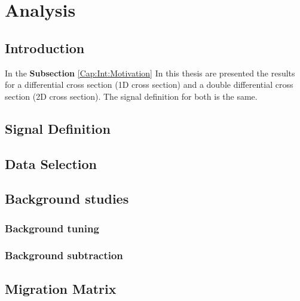 \chapter{Analysis}
\minitoc
\label{Cap:Analysis}

\section{Introduction}
\label{Cap:Analysis:Introduction}
In the \textbf{Subsection} \ref{Cap:Int:Motivation} In this thesis are presented the results for a differential cross section (1D cross section) and a double differential cross section (2D cross section). The signal definition for both is the same. 


\section{Signal Definition}

\section{Data Selection}



\section{Background studies}

\subsection{Background tuning}

\subsection{Background subtraction}

\section{Migration Matrix}


